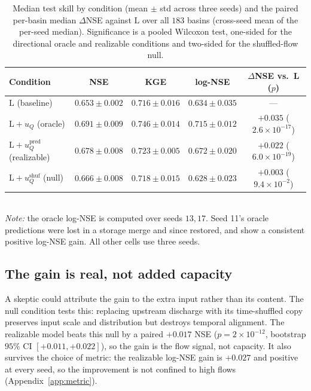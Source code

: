 \documentclass[11pt]{article}
\begin{document}
\begin{table}[t]
\centering
\caption{Median test skill by condition (mean $\pm$ std across three seeds) and the paired per-basin
median $\Delta$NSE against $\mathrm{L}$ over all $183$ basins (cross-seed mean of the per-seed
median). Significance is a pooled Wilcoxon test, one-sided for the directional oracle and realizable
conditions and two-sided for the shuffled-flow null.}
\label{tab:main}
\begin{tabular}{lcccc}
\toprule
Condition & NSE & KGE & log-NSE & $\Delta$NSE vs.\ L ($p$) \\
\midrule
$\mathrm{L}$ (baseline) & $0.653\pm0.002$ & $0.716\pm0.016$ & $0.634\pm0.035$ & --- \\
$\mathrm{L}{+}u_Q$ (oracle) & $0.691\pm0.009$ & $0.746\pm0.014$ & $0.715\pm0.012$ & $+0.035$ ($2.6\!\times\!10^{-17}$) \\
$\mathrm{L}{+}u_Q^{\mathrm{pred}}$ (realizable) & $0.678\pm0.008$ & $0.723\pm0.005$ & $0.672\pm0.020$ & $+0.022$ ($6.0\!\times\!10^{-19}$) \\
$\mathrm{L}{+}u_Q^{\mathrm{shuf}}$ (null) & $0.666\pm0.008$ & $0.718\pm0.015$ & $0.628\pm0.023$ & $+0.003$ ($9.4\!\times\!10^{-2}$) \\
\bottomrule
\end{tabular}
\\[3pt]
{\footnotesize \emph{Note:} the oracle log-NSE is computed over seeds $13,17$. Seed 11's oracle
predictions were lost in a storage merge and since restored, and show a consistent positive
log-NSE gain. All other cells use three seeds.}
\end{table}

\subsection{The gain is real, not added capacity}
\label{sec:res-real}

A skeptic could attribute the gain to the extra input rather than its content. The null condition
tests this: replacing upstream discharge with its time-shuffled copy preserves input scale and
distribution but destroys temporal alignment. The realizable model beats this null by a paired
$+0.017$ NSE ($p=2\times10^{-12}$, bootstrap $95\%$ CI $[+0.011,+0.022]$), so the gain is the flow
signal, not capacity. It also survives the choice of metric: the realizable log-NSE gain is $+0.027$
and positive at every seed, so the improvement is not confined to high flows
(Appendix~\ref{app:metric}).
\end{document}
